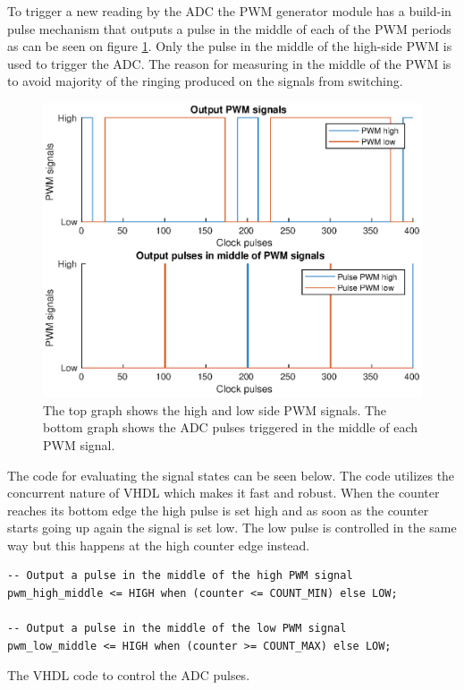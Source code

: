 To trigger a new reading by the ADC the PWM generator module has a build-in pulse mechanism that outputs a pulse in the middle of each of the PWM periods as can be seen on figure \ref{fig:adc_pulses}. Only the pulse in the middle of the high-side PWM is used to trigger the ADC. The reason for measuring in the middle of the PWM is to avoid majority of the ringing produced on the signals from switching.

\begin{figure}[H]
	\centering
	\includegraphics[width=0.8 \textwidth]{pictures/software/adc_pulses.eps}
	\caption{The top graph shows the high and low side PWM signals. The bottom graph shows the ADC pulses triggered in the middle of each PWM signal.}
	\label{fig:adc_pulses}
\end{figure}

The code for evaluating the signal states can be seen below. The code utilizes the concurrent nature of VHDL which makes it fast and robust.
When the counter reaches its bottom edge the high pulse is set high and as soon as the counter starts going up again the signal is set low. The low pulse is controlled in the same way but this happens at the high counter edge instead.

\begin{verbatim}
-- Output a pulse in the middle of the high PWM signal
pwm_high_middle <= HIGH when (counter <= COUNT_MIN) else LOW;

-- Output a pulse in the middle of the low PWM signal
pwm_low_middle <= HIGH when (counter >= COUNT_MAX) else LOW;
\end{verbatim}
\begin{center}
    The VHDL code to control the ADC pulses.
\end{center}


